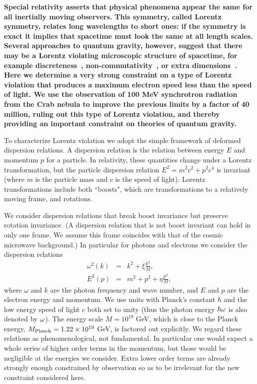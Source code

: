 \documentclass[12pt]{article}
\begin{document}
{\bf Special relativity asserts that physical phenomena
  appear the same for all inertially moving
  observers. This symmetry, called Lorentz symmetry,
  relates long wavelengths to short ones: if the symmetry
  is exact it implies that spacetime must look the same
  at all length scales. Several approaches to quantum
  gravity, however, suggest that there may be a Lorentz
  violating microscopic structure of spacetime, for
  example discreteness~\cite{loopqg},
  non-commutativity~\cite{Carroll:2001ws}, or extra
  dimensions~\cite{Burgess:2002tb}. Here we determine a
  very strong constraint on a type of Lorentz violation
  that produces a maximum electron speed less than the
  speed of light. We use the observation of 100 MeV
  synchrotron radiation from the Crab nebula to improve
  the previous limits by a factor of 40 million, ruling
  out this type of Lorentz violation, and thereby
  providing an important constraint on theories of
  quantum gravity.}

To characterize Lorentz violation we adopt the simple framework
of deformed dispersion relations. A dispersion relation is the
relation between energy $E$ and momentum $p$ for a particle. In
relativity, these quantities change under a Lorentz
transformation, but the particle dispersion relation $E^2 = m^2c^2
+ p^2c^4$ is invariant (where $m$ is the particle mass
and $c$ is the speed of light). Lorentz transformations include both
``boosts", which are transformations to a relatively moving
frame, and rotations.

We consider dispersion relations  that break boost invariance but
preserve rotation invariance. (A dispersion relation that is not
boost invariant can hold in only one frame. We assume this frame
coincides with that of the cosmic microwave background.)  In
particular for photons and electrons we consider the dispersion
relations
%
\begin{eqnarray}
\omega^2(k)&=& k^2+\xi \frac{k^3}{M},
\label{eq:pdr}\\
%
E^2(p)&=& m^2+ p^2+\eta \frac{p^3}{M}, \label{eq:mdr}
\end{eqnarray}
%
where $\omega$ and $k$ are the photon frequency and wave
number, and $E$ and $p$ are the electron energy and
momentum. We use units with Planck's constant $\hbar$ and
the low energy speed of light $c$ both set to unity (thus
the photon energy $\hbar\omega$ is also denoted by $\omega$). The
energy scale $M=10^{19}$ GeV, which is close to the
Planck energy, $M_{\rm Planck}=1.22\times 10^{19}$ GeV, is
factored out explicitly. We regard these relations as
phenomenological, not fundamental. In particular one
would expect a whole series of higher order terms in the
momentum, but those would be negligible at the energies
we consider. Extra lower order terms are already strongly
enough constrained by observation so as to be irrelevant
for the new constraint considered here.
\end{document}
